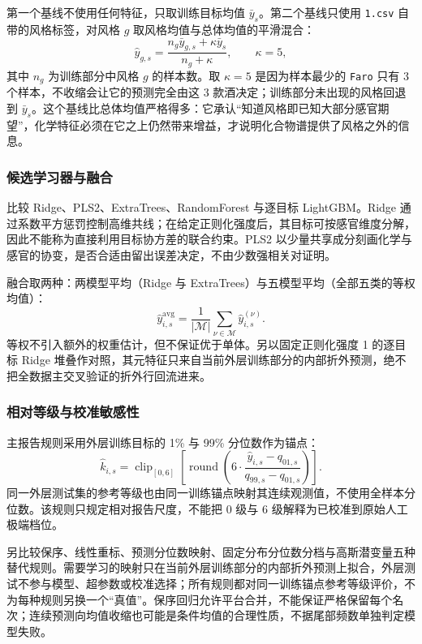 \documentclass[UTF8,a4paper,zihao=-4]{ctexart}
\numberwithin{figure}{section}
\numberwithin{table}{section}
\numberwithin{equation}{section}
\newcommand{\file}[1]{\texttt{#1}}
\begin{document}
第一个基线不使用任何特征，只取训练目标均值 $\bar y_s$。第二个基线只使用 \file{1.csv} 自带的风格标签，对风格 $g$ 取风格均值与总体均值的平滑混合：
\begin{equation}
\hat y_{g,s}=\frac{n_{g}\bar y_{g,s}+\kappa\bar y_{s}}{n_{g}+\kappa},\qquad \kappa=5,
\label{eq:style-baseline}
\end{equation}
其中 $n_g$ 为训练部分中风格 $g$ 的样本数。取 $\kappa=5$ 是因为样本最少的 \file{Faro} 只有 3 个样本，不收缩会让它的预测完全由这 3 款酒决定；训练部分未出现的风格回退到 $\bar y_s$。这个基线比总体均值严格得多：它承认“知道风格即已知大部分感官期望”，化学特征必须在它之上仍然带来增益，才说明化合物谱提供了风格之外的信息。

\subsubsection{候选学习器与融合}

比较 Ridge、PLS2、ExtraTrees、RandomForest 与逐目标 LightGBM\cite{hastie2009,wold2001}。Ridge 通过系数平方惩罚控制高维共线；在给定正则化强度后，其目标可按感官维度分解，因此不能称为直接利用目标协方差的联合约束。PLS2 以少量共享成分刻画化学与感官的协变，是否合适由留出误差决定，不由少数强相关对证明。

融合取两种：两模型平均（Ridge 与 ExtraTrees）与五模型平均（全部五类的等权均值）：
\begin{equation}
\hat y_{i,s}^{\mathrm{avg}}=\frac{1}{|\mathcal{M}|}\sum_{\nu\in\mathcal{M}}\hat y_{i,s}^{(\nu)}.
\label{eq:fusion}
\end{equation}
等权不引入额外的权重估计，但不保证优于单体。另以固定正则化强度 1 的逐目标 Ridge 堆叠作对照，其元特征只来自当前外层训练部分的内部折外预测，绝不把全数据主交叉验证的折外行回流进来。

\subsubsection{相对等级与校准敏感性}

主报告规则采用外层训练目标的 1\% 与 99\% 分位数作为锚点：
\begin{equation}
\hat k_{i,s}=\operatorname{clip}_{[0,6]}\left[\operatorname{round}\left(6\cdot\frac{\hat y_{i,s}-q_{01,s}}{q_{99,s}-q_{01,s}}\right)\right].
\label{eq:grade}
\end{equation}
同一外层测试集的参考等级也由同一训练锚点映射其连续观测值，不使用全样本分位数。该规则只规定相对报告尺度，不能把 0 级与 6 级解释为已校准到原始人工极端档位。

另比较保序、线性重标、预测分位数映射、固定分布分位数分档与高斯潜变量五种替代规则。需要学习的映射只在当前外层训练部分的内部折外预测上拟合，外层测试不参与模型、超参数或校准选择；所有规则都对同一训练锚点参考等级评价，不为每种规则另换一个“真值”。保序回归允许平台合并，不能保证严格保留每个名次；连续预测向均值收缩也可能是条件均值的合理性质，不据尾部频数单独判定模型失败。
\end{document}
